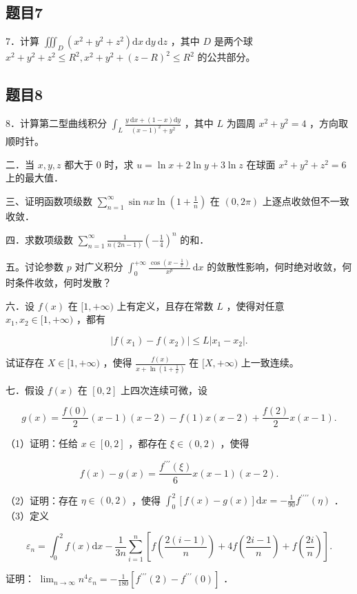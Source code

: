 \documentclass{article}
\begin{document}
\subsection{题目7}
7．计算 \(\iiint_{D}\left(x^{2}+y^{2}+z^{2}\right) \mathrm{d} x \mathrm{~d} y \mathrm{~d} z\) ，其中 \(D\) 是两个球 \(x^{2}+y^{2}+z^{2} \leq R^{2}, x^{2}+y^{2}+(z-R)^{2} \leq R^{2}\) 的公共部分。

\subsection{题目8}
8．计算第二型曲线积分 \(\int_{L} \frac{y \mathrm{~d} x+(1-x) \mathrm{d} y}{(x-1)^{2}+y^{2}}\) ，其中 \(L\) 为圆周 \(x^{2}+y^{2}=4\) ，方向取顺时针。

二．当 \(x, y, z\) 都大于 0 时，求 \(u=\ln x+2 \ln y+3 \ln z\) 在球面 \(x^{2}+y^{2}+z^{2}=6\) 上的最大值．

三、证明函数项级数 \(\sum_{n=1}^{\infty} \sin n x \ln \left(1+\frac{1}{n}\right)\) 在 \((0,2 \pi)\) 上逐点收敛但不一致收敛．

四．求数项级数 \(\sum_{n=1}^{\infty} \frac{1}{n(2 n-1)}\left(-\frac{1}{4}\right)^{n}\) 的和．

五。讨论参数 \(p\) 对广义积分 \(\int_{0}^{+\infty} \frac{\cos \left(x-\frac{1}{x}\right)}{x^{p}} \mathrm{~d} x\) 的敛散性影响，何时绝对收敛，何时条件收敛，何时发散？

六．设 \(f(x)\) 在 \([1,+\infty)\) 上有定义，且存在常数 \(L\) ，使得对任意 \(x_{1}, x_{2} \in[1,+\infty)\) ，都有

\[
\left|f\left(x_{1}\right)-f\left(x_{2}\right)\right| \leq L\left|x_{1}-x_{2}\right| .
\]

试证存在 \(X \in[1,+\infty)\) ，使得 \(\frac{f(x)}{x+\ln \left(1+\frac{1}{x}\right)}\) 在 \([X,+\infty)\) 上一致连续。

七．假设 \(f(x)\) 在 \([0,2]\) 上四次连续可微，设

\[
g(x)=\frac{f(0)}{2}(x-1)(x-2)-f(1) x(x-2)+\frac{f(2)}{2} x(x-1) .
\]

（1）证明：任给 \(x \in[0,2]\) ，都存在 \(\xi \in(0,2)\) ，使得

\[
f(x)-g(x)=\frac{f^{\prime \prime \prime}(\xi)}{6} x(x-1)(x-2) .
\]

（2）证明：存在 \(\eta \in(0,2)\) ，使得 \(\int_{0}^{2}[f(x)-g(x)] \mathrm{d} x=-\frac{1}{90} f^{\prime \prime \prime \prime}(\eta)\) ．\\
（3）定义

\[
\varepsilon_{n}=\int_{0}^{2} f(x) \mathrm{d} x-\frac{1}{3 n} \sum_{i=1}^{n}\left[f\left(\frac{2(i-1)}{n}\right)+4 f\left(\frac{2 i-1}{n}\right)+f\left(\frac{2 i}{n}\right)\right] .
\]

证明： \(\lim _{n \rightarrow \infty} n^{4} \varepsilon_{n}=-\frac{1}{180}\left[f^{\prime \prime \prime}(2)-f^{\prime \prime \prime}(0)\right]\) ．
\end{document}
